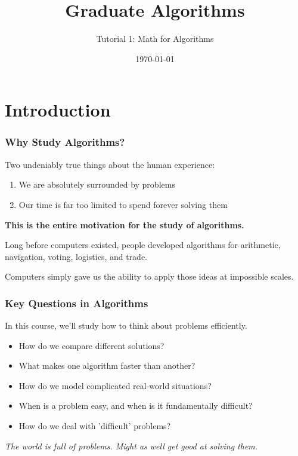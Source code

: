 \documentclass{beamer}
\title{Graduate Algorithms}
\subtitle{Tutorial 1: Math for Algorithms}
\author{}
\date{\today}
\begin{document}
\frame{\titlepage}


\section{Introduction}

\begin{frame}
  \frametitle{Why Study Algorithms?}
  Two undeniably true things about the human experience:
  \begin{enumerate}
    \item We are absolutely surrounded by problems
    \item Our time is far too limited to spend forever solving them
  \end{enumerate}
  
  \vspace{0.5cm}
  
  \textbf{This is the entire motivation for the study of algorithms.}
  
  \vspace{0.3cm}
  
  Long before computers existed, people developed algorithms for arithmetic, navigation, voting, logistics, and trade.
  
  Computers simply gave us the ability to apply those ideas at impossible scales.
\end{frame}

\begin{frame}
  \frametitle{Key Questions in Algorithms}
  
  In this course, we'll study how to think about problems efficiently.
  
  \begin{itemize}
    \item How do we compare different solutions?
    \item What makes one algorithm faster than another?
    \item How do we model complicated real-world situations?
    \item When is a problem easy, and when is it fundamentally difficult?
    \item How do we deal with 'difficult' problems?
  \end{itemize}
  
  \vspace{0.3cm}
  
  \textit{The world is full of problems. Might as well get good at solving them.}
\end{frame}
\end{document}

